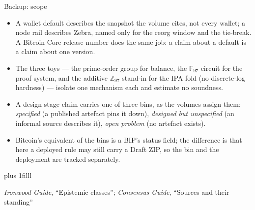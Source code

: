 \documentclass[aspectratio=169,11pt]{beamer}
\newcommand{\F}{\mathbb{F}}
\newcommand{\src}[1]{\par\vskip0pt plus 1filll
  {\fontsize{6}{7.2}\selectfont\color{arbdim}\raggedright #1\par}}
\begin{document}
\begin{frame}{Backup: scope}
\begin{itemize}
  \item A wallet default describes the snapshot the volume cites, not
    every wallet; a node rail describes Zebra, named only for the reorg
    window and the tie-break. A Bitcoin Core release number does the same
    job: a claim about a default is a claim about one version.
  \item The three toys --- the prime-order group for balance, the
    $\F_{97}$ circuit for the proof system, and the additive
    $\mathbb{Z}_{97}$ stand-in for the IPA fold (no discrete-log
    hardness) --- isolate one mechanism each and estimate no soundness.
  \item A design-stage claim carries one of three bins, as the volumes
    assign them: \emph{specified} (a published artefact pins it down),
    \emph{designed but unspecified} (an informal source describes it),
    \emph{open problem} (no artefact exists).
  \item Bitcoin's equivalent of the bins is a BIP's status field; the
    difference is that here a deployed rule may still carry a Draft ZIP,
    so the bin and the deployment are tracked separately.
\end{itemize}
\src{\emph{Ironwood Guide}, ``Epistemic classes''; \emph{Consensus Guide},
  ``Sources and their standing''}
\end{frame}
\end{document}
